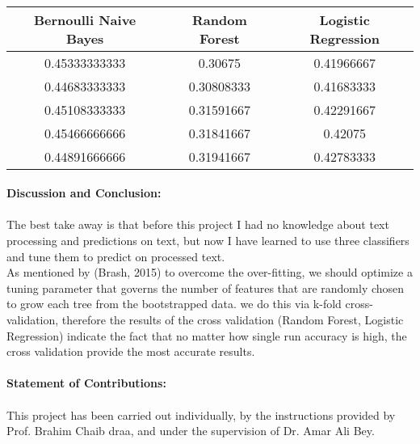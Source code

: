 \documentclass[12pt]{report}
\begin{document}
	\paragraph{}
	\begin{center}
		\begin{tabular}{||c c c||} 
			\hline
			Bernoulli Naive Bayes & Random Forest & Logistic Regression\\ [0.5ex] 
			\hline\hline
			0.45333333333 & 0.30675 & 0.41966667\\ 
			\hline
			0.44683333333 & 0.30808333 & 0.41683333\\
			\hline
			0.45108333333 & 0.31591667 & 0.42291667\\
			\hline
			0.45466666666 & 0.31841667& 0.42075   \\
			\hline
			0.44891666666 & 0.31941667 & 0.42783333\\ [1ex] 
			\hline
		\end{tabular}
	\end{center}
		

	\paragraph{Discussion and Conclusion:}
	\paragraph{}
	The best take away is that before this project I had no knowledge about text processing and predictions on text, but now I have learned to use three classifiers and tune them to predict on processed text. \\
	As mentioned by (Brash, 2015) to overcome the over-fitting, we should optimize a tuning parameter that governs the number of features that are randomly chosen to grow each tree from the bootstrapped data. we do this via k-fold cross-validation, therefore the results of the cross validation (Random Forest, Logistic Regression) indicate the fact that no matter how single run accuracy is high, the cross validation provide the most accurate results.\\
		

	\paragraph{Statement of Contributions:}
	\paragraph{}
	This project has been carried out individually, by the instructions provided by Prof. Brahim Chaib draa, and under the supervision of Dr. Amar Ali Bey.\\
	
\end{document}
